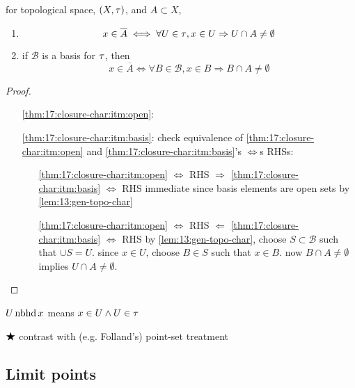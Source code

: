 \begin{thm}\label{thm:17.5}\label{thm:17:closure-char}
  for topological space, $(X,\operatorname{\tau})$, and $A\subset X$,
  \begin{enumerate}[label=(\alph*)]
  \item\label{thm:17:closure-char:itm:open}
    \[
    x\in\overline{A} \iff
    \forall U\in\operatorname{\tau}, x\in U \Rightarrow U\cap A\neq\emptyset
    \]
  \item\label{thm:17:closure-char:itm:basis}
    if $\mathcal B$ is a basis for $\operatorname{\tau}$, then
    \[
    x\in\overline{A} \iff
    \forall B\in\mathcal B, x\in B \Rightarrow B\cap A\neq\emptyset
    \]
  \end{enumerate}
\end{thm}
\begin{proof}\
  \begin{itemize}
  \item[\ref{thm:17:closure-char:itm:open}:]
  \item[\ref{thm:17:closure-char:itm:basis}:]
    check equivalence of \ref{thm:17:closure-char:itm:open}
    and \ref{thm:17:closure-char:itm:basis}'s $\iff$s RHSs:
    \begin{itemize}
    \item[\ref{thm:17:closure-char:itm:open} $\iff$ RHS $\Rightarrow$
      \ref{thm:17:closure-char:itm:basis} $\iff$ RHS]
      immediate since basis elements are open sets by
      \ref{lem:13:gen-topo-char}
    \item[\ref{thm:17:closure-char:itm:open} $\iff$ RHS $\Leftarrow$
      \ref{thm:17:closure-char:itm:basis} $\iff$ RHS]
      by \ref{lem:13:gen-topo-char},
      choose $S\subset \mathcal B$ such that $\cup S = U$.
      since $x\in U$, choose $B\in S$ such that $x\in B$.
      now $B\cap A\neq\emptyset$ implies $U\cap A\neq\emptyset$.
    \end{itemize}
  \end{itemize}
\end{proof}

\begin{defn}
  $U\operatorname{nbhd} x$ means $x\in U\land U\in\operatorname{\tau}$
\end{defn}

$\bigstar$ contrast with (e.g. Folland's) point-set treatment

\subsection{Limit points}

